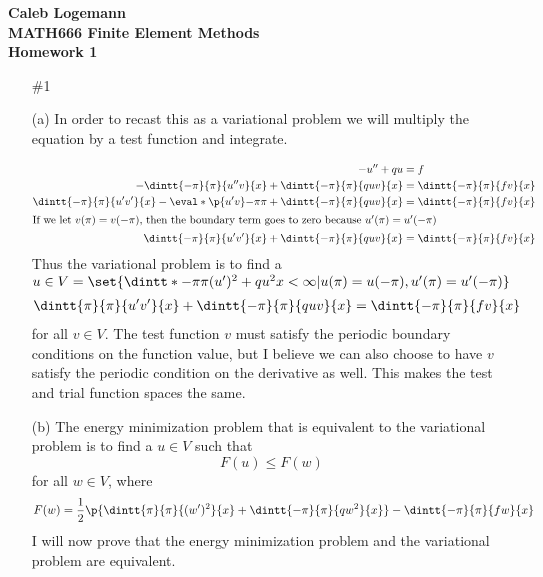 \documentclass[11pt, oneside]{article}
\begin{document}
\noindent \textbf{\Large{Caleb Logemann \\
MATH666 Finite Element Methods \\
Homework 1
}}

%
\begin{enumerate}
  \item[\#1]
    \item[(a)] %
      In order to recast this as a variational problem we will multiply the
      equation by a test function and integrate.

      \begin{align*}
        -u'' + q u &= f \\
        -\dintt{-\pi}{\pi}{u''v}{x} + \dintt{-\pi}{\pi}{quv}{x} &= \dintt{-\pi}{\pi}{fv}{x}\\
        \dintt{-\pi}{\pi}{u'v'}{x} - \eval*{\p{u'v}}{-\pi}{\pi}+ \dintt{-\pi}{\pi}{quv}{x} &= \dintt{-\pi}{\pi}{fv}{x} \\
        \intertext{If we let $v(\pi) = v(-\pi)$, then the boundary term goes to zero because $u'(\pi) = u'(-\pi)$}
        \dintt{-\pi}{\pi}{u'v'}{x} + \dintt{-\pi}{\pi}{quv}{x} &= \dintt{-\pi}{\pi}{fv}{x} \\
      \end{align*}
      Thus the variational problem is to find a
      $u \in V = \set{\dintt*{-\pi}{\pi}{(u')^2 + qu^2}{x} < \infty | u(\pi) = u(-\pi), u'(\pi) = u'(-\pi)}$
      \begin{align*}
        \dintt{\pi}{\pi}{u'v'}{x} + \dintt{-\pi}{\pi}{quv}{x} &= \dintt{-\pi}{\pi}{fv}{x}
      \end{align*}
      for all $v \in V$.
      The test function $v$ must satisfy the periodic boundary conditions on the
      function value, but I believe we can also choose to have $v$ satisfy the
      periodic condition on the derivative as well.
      This makes the test and trial function spaces the same.

    \item[(b)] %
      The energy minimization problem that is equivalent to the variational
      problem is to find a $u \in V$ such that
      \[
        F(u) \le F(w)
      \]
      for all $w \in V$, where
      \[
        F(w) = \frac{1}{2}\p{\dintt{\pi}{\pi}{(w')^2}{x} + \dintt{-\pi}{\pi}{qw^2}{x}} - \dintt{-\pi}{\pi}{fw}{x}
      \]
      I will now prove that the energy minimization problem and the variational
      problem are equivalent.


\end{enumerate}
\end{document}

